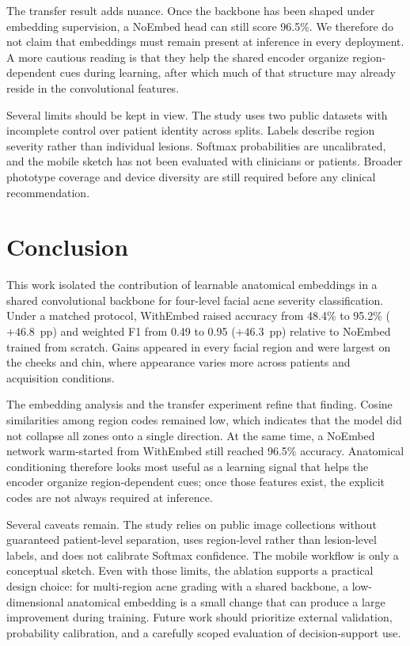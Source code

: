 \documentclass[10pt,conference]{IEEEtran}
\begin{document}
The transfer result adds nuance. Once the backbone has been shaped under embedding supervision, a NoEmbed head can still score 96.5\%. We therefore do not claim that embeddings must remain present at inference in every deployment. A more cautious reading is that they help the shared encoder organize region-dependent cues during learning, after which much of that structure may already reside in the convolutional features.

Several limits should be kept in view. The study uses two public datasets with incomplete control over patient identity across splits. Labels describe region severity rather than individual lesions. Softmax probabilities are uncalibrated, and the mobile sketch has not been evaluated with clinicians or patients. Broader phototype coverage and device diversity are still required before any clinical recommendation.

\section{Conclusion}
This work isolated the contribution of learnable anatomical embeddings in a shared convolutional backbone for four-level facial acne severity classification. Under a matched protocol, WithEmbed raised accuracy from 48.4\% to 95.2\% ($+46.8$~pp) and weighted F1 from 0.49 to 0.95 ($+46.3$~pp) relative to NoEmbed trained from scratch. Gains appeared in every facial region and were largest on the cheeks and chin, where appearance varies more across patients and acquisition conditions.

The embedding analysis and the transfer experiment refine that finding. Cosine similarities among region codes remained low, which indicates that the model did not collapse all zones onto a single direction. At the same time, a NoEmbed network warm-started from WithEmbed still reached 96.5\% accuracy. Anatomical conditioning therefore looks most useful as a learning signal that helps the encoder organize region-dependent cues; once those features exist, the explicit codes are not always required at inference.

Several caveats remain. The study relies on public image collections without guaranteed patient-level separation, uses region-level rather than lesion-level labels, and does not calibrate Softmax confidence. The mobile workflow is only a conceptual sketch. Even with those limits, the ablation supports a practical design choice: for multi-region acne grading with a shared backbone, a low-dimensional anatomical embedding is a small change that can produce a large improvement during training. Future work should prioritize external validation, probability calibration, and a carefully scoped evaluation of decision-support use.
\end{document}
